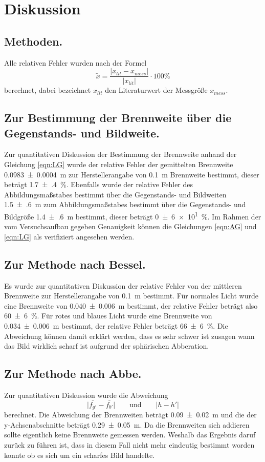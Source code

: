\section{Diskussion}
\label{sec:Diskussion}
\subsection{Methoden.}
Alle relativen Fehler wurden nach der Formel
\begin{equation*}
  \tilde{x} = \frac{ \lvert x_{lit} - x_{mess} \rvert}{\lvert x_{lit} \rvert}
  \cdot 100 \%
\end{equation*}
berechnet, dabei bezeichnet $x_{lit}$ den Literaturwert der Messgröße $x_{mess}$.

\subsection{Zur Bestimmung der Brennweite über die Gegenstands- und Bildweite.}
Zur quantitativen Diskussion der Bestimmung der Brennweite anhand der Gleichung
\eqref{eqn:LG} wurde der relative Fehler der gemittelten Brennweite
\SI{0.0983(4)}{\meter} zur Herstellerangabe von \SI{0.1}{\meter} Brennweite
bestimmt, dieser beträgt \SI{1.7(4)}{\percent}. Ebenfalls wurde der relative
Fehler des Abbildungsmaßstabes bestimmt über die Gegenstands- und Bildweiten
\SI{1.5(6)}{\meter}
zum Abbildungsmaßstabes bestimmt über die Gegenstands- und Bildgröße
\SI{1.4(6)}{\meter} bestimmt, dieser beträgt \SI{0(6)e1}{\percent}.
Im Rahmen der vom Versuchsaufbau gegeben Genauigkeit können die Gleichungen
\eqref{eqn:AG} und \eqref{eqn:LG} als verifiziert angesehen werden.

\subsection{Zur Methode nach Bessel.}
Es wurde zur quantitativen Diskussion der relative Fehler von
der mittleren Brennweite zur Herstellerangabe von \SI{0.1}{\meter} bestimmt.
Für normales Licht wurde eine Brennweite von \SI{0.040(6)}{\meter} bestimmt,
der relative Fehler beträgt also \SI{60(6)}{\percent}.
Für rotes und blaues Licht wurde eine Brennweite von \SI{0.034(6)}{\meter}
bestimmt, der relative Fehler beträgt \SI{66(6)}{\percent}. Die Abweichung
können damit erklärt werden, dass es sehr schwer ist zusagen wann das
Bild wirklich scharf ist aufgrund der sphärischen Abberation.

\subsection{Zur Methode nach Abbe.}
Zur quantitativen Diskussion wurde die Abweichung
\begin{equation*}
  \lvert \bar{f_{g'}} - \bar{f_{b'}} \rvert
  \qquad \text{und} \qquad
  \lvert h - h' \rvert
\end{equation*}
berechnet. Die Abweichung der Brennweiten beträgt \SI{0.09(2)}{\meter}
und die der y-Achsenabschnitte beträgt \SI{0.29(5)}{\meter}. Da die Brennweiten
sich addieren sollte eigentlich keine Brennweite gemessen werden.
Weshalb das Ergebnis daruf zurück zu führen ist, dass in diesem Fall nicht
mehr eindeutig bestimmt worden konnte ob es sich um ein scharfes Bild
handelte.
